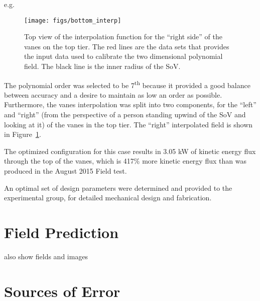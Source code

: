 e.g.

 \begin{figure}[!htb]
  \begin{center}
   \texttt{[image: figs/bottom\_interp]}
   \caption{Top view of the interpolation function for the ``right
   side'' of the vanes on the top tier. The red lines are the data sets
   that provides the input data used to calibrate the two dimensional
   polynomial field. The black line is the inner radius of the SoV.}
   \label{fig:bottom_interp}
  \end{center}
 \end{figure}

The polynomial order was selected to be 7\textsuperscript{th} because it
provided a good balance between accuracy and a desire to maintain as low
an order as possible. Furthermore, the vanes interpolation was split
into two components, for the ``left'' and ``right'' (from the perspective of a
person standing upwind of the SoV and looking at it) of the vanes in the
top tier. The ``right'' interpolated field is shown in
Figure~\ref{fig:bottom_interp}. 

%
%

The optimized configuration for this case results in 3.05 kW of kinetic
energy flux through the top of the vanes, which is 417\% more kinetic
energy flux than was produced in the August 2015 Field test.

An optimal set of design parameters were determined and provided to the
experimental group, for detailed mechanical design and
fabrication.



\section{Field Prediction}
\label{subsec:field_predict}

also show fields and images

\section{Sources of Error}

%

